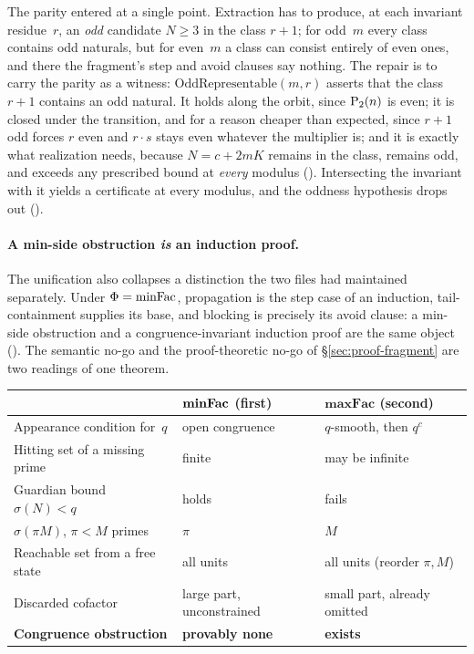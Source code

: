 The parity entered at a single point.  Extraction has to produce, at each
invariant residue~$r$, an \emph{odd} candidate $N \geq 3$ in the class
$r+1$; for odd~$m$ every class contains odd naturals, but for even~$m$ a
class can consist entirely of even ones, and there the fragment's step and
avoid clauses say nothing.  The repair is to carry the parity as a witness:
$\mathrm{OddRepresentable}(m,r)$ asserts that the class $r+1$ contains an
odd natural.  It holds along the orbit, since $\mathrm{P}_{2}(n)$ is even; it is
closed under the transition, and for a reason cheaper than expected, since
$r+1$ odd forces $r$ even and $r \cdot s$ stays even whatever the multiplier
is; and it is exactly what realization needs, because $N = c + 2mK$ remains
in the class, remains odd, and exceeds any prescribed bound at
\emph{every} modulus
().
Intersecting the invariant with it yields a certificate at every modulus, and
the oddness hypothesis drops out
().

\paragraph{A min-side obstruction \emph{is} an induction proof.}
The unification also collapses a distinction the two files had maintained
separately.  Under $\Phi = \mathrm{minFac}$, propagation is the step case of an
induction, tail-containment supplies its base, and blocking is precisely its
avoid clause: a min-side obstruction and a congruence-invariant induction
proof are the same object
().  The semantic
no-go and the proof-theoretic no-go of \S\ref{sec:proof-fragment} are two
readings of one theorem.

\smallskip
\begin{center}
\begin{tabular}{@{}l@{\quad}l@{\quad}l@{}}
\toprule
 & $\boldsymbol{\mathrm{minFac}}$ \textbf{(first)} & $\mathbf{maxFac}$ \textbf{(second)} \\
\midrule
Appearance condition for~$q$
  & open congruence & $q$-smooth, then $q^c$ \\
Hitting set of a missing prime
  & finite & may be infinite \\
Guardian bound $\sigma(N) < q$
  & holds & fails \\
$\sigma(\pi M)$, $\pi < M$ primes
  & $\pi$ & $M$ \\
Reachable set from a free state
  & all units & all units (reorder $\pi, M$) \\
Discarded cofactor
  & large part, unconstrained & small part, already omitted \\
\midrule
\textbf{Congruence obstruction}
  & \textbf{provably none} & \textbf{exists} \\
\bottomrule
\end{tabular}
\end{center}

